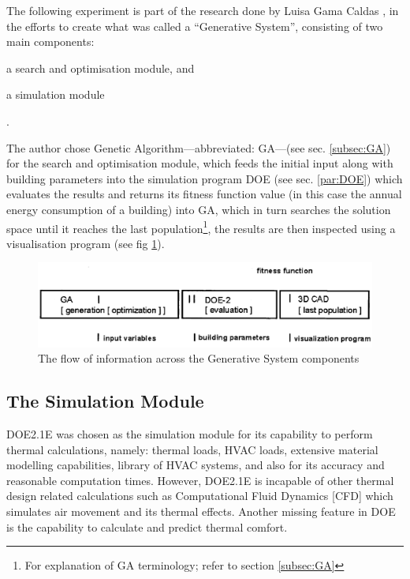 The following experiment is part of the research done by Luisa Gama Caldas \cite{caldas01}, in the efforts to create what was called a ``Generative System'', consisting of two main components: \begin{inparaenum} \item a search and optimisation module, and \item a simulation module \end{inparaenum}.

The author chose Genetic Algorithm---abbreviated: GA---(see sec. \ref{subsec:GA}) for the search and optimisation module, which feeds the initial input along with building parameters into the simulation program DOE (see sec. \ref{par:DOE}) which evaluates the results and returns its fitness function value (in this case the annual energy consumption of a building) into GA, which in turn searches the solution space until it reaches the last population\footnote{For explanation of GA terminology; refer to section \ref{subsec:GA}}, the results are then inspected using a visualisation program (see fig \ref{fig:GSfitFun}).

\begin{figure}[htbp]
\centering
\includegraphics[width=\textwidth]{./Images/15-FitnessFunction}
\caption[GS Information Flow]{The flow of information across the Generative System components \cite{caldas01}}
\label{fig:GSfitFun}
\end{figure}

\subsection{The Simulation Module}
DOE2.1E was chosen as the simulation module for its capability to perform thermal calculations, namely: thermal loads, HVAC loads, extensive material modelling capabilities, library of HVAC systems, and also for its accuracy and reasonable computation times. However, DOE2.1E is incapable of other thermal design related calculations such as Computational Fluid Dynamics [CFD] which simulates air movement and its thermal effects. Another missing feature in DOE is the capability to calculate and predict thermal comfort. 

